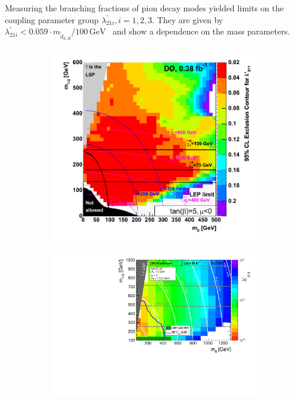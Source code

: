 \noindent Measuring the branching fractions of pion decay modes yielded limits on the coupling parameter group $\lambda^\prime_{21i}, i = 1, 2, 3$. They are given by $\lambda^\prime_{21i} < 0.059 \cdot m_{\tilde{d}_{k, R}} / 100\,\text{GeV}$~\cite{rpvimpl} and show a dependence on the mass parameters.

\begin{figure}[!htbp]
  \centering
  \begin{subfigure}[b]{0.77\textwidth}
    \centering
    \includegraphics[width=\textwidth]{plots/auterrpv.pdf}
    \caption{\label{fig:auterrpv}}
  \end{subfigure}
  \begin{subfigure}[b]{0.77\textwidth}
    \centering
    \includegraphics[width=\textwidth]{plots/2011-l211limits_MultiBin_logz-colz.pdf}

\end{subfigure}
\end{figure}
